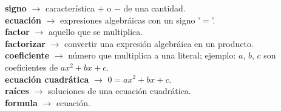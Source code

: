 \begin{defcard}
    \textbf{signo} $\rightarrow$ característica $+$ o $-$ de una cantidad.\\
    \textbf{ecuación} $\rightarrow$ expresiones algebráicas con un signo '$=$'.\\
    \textbf{factor} $\rightarrow$ aquello que se multiplica.\\
    \textbf{factorizar} $\rightarrow$ convertir una expresión algebráica en un producto.\\
    \textbf{coeficiente} $\rightarrow$ número que multiplica a una literal; ejemplo: $a$, $b$, $c$ son coeficientes de $ax^2+bx+c$.\\
    \textbf{ecuación cuadrática} $\rightarrow$ $0 = ax^2+bx+c$.\\
    \textbf{raíces} $\rightarrow$ soluciones de una ecuación cuadrática.\\
    \textbf{formula} $\rightarrow$ ecuación.
\end{defcard}